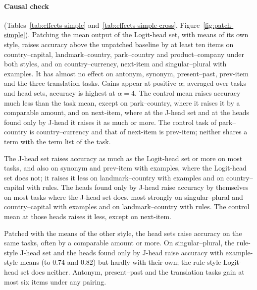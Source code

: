 \documentclass[11pt,a4paper]{article}
\begin{document}
\paragraph{Causal check} (Tables~\ref{tab:effects-simple} and~\ref{tab:effects-simple-cross}, Figure~\ref{fig:patch-simple}). Patching the mean output of the Logit-head set, with means of its own style, raises accuracy above the unpatched baseline by at least ten items on country--capital, landmark--country, park--country and product--company under both styles, and on country--currency, next-item and singular--plural with examples. It has almost no effect on antonym, synonym, present--past, prev-item and the three translation tasks. Gains appear at positive $\alpha$; averaged over tasks and head sets, accuracy is highest at $\alpha=4$. The control mean raises accuracy much less than the task mean, except on park--country, where it raises it by a comparable amount, and on next-item, where at the J-head set and at the heads found only by J-head it raises it as much or more. The control task of park--country is country--currency and that of next-item is prev-item; neither shares a term with the term list of the task.

The J-head set raises accuracy as much as the Logit-head set or more on most tasks, and also on synonym and prev-item with examples, where the Logit-head set does not; it raises it less on landmark--country with examples and on country--capital with rules. The heads found only by J-head raise accuracy by themselves on most tasks where the J-head set does, most strongly on singular--plural and country--capital with examples and on landmark--country with rules. The control mean at those heads raises it less, except on next-item.

Patched with the means of the other style, the head sets raise accuracy on the same tasks, often by a comparable amount or more. On singular--plural, the rule-style J-head set and the heads found only by J-head raise accuracy with example-style means (to 0.74 and 0.82) but hardly with their own; the rule-style Logit-head set does neither. Antonym, present--past and the translation tasks gain at most six items under any pairing.
\end{document}
